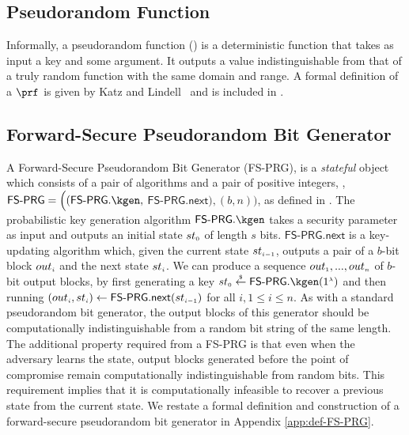  
 

\subsection{Pseudorandom Function}\label{subsec:PRF}

Informally, a pseudorandom function (\prf) is a deterministic function that takes as input a key and some argument. It outputs a value indistinguishable from that of a truly random function with the same domain and range.  A formal definition of a $\prf$ is given by Katz and Lindell~\cite{KatzLindell2014} and is included in .

\subsection{Forward-Secure Pseudorandom Bit Generator}

A Forward-Secure Pseudorandom Bit Generator (FS-PRG), is a \emph{stateful} object which consists of a pair of algorithms and a pair of positive integers, \ie, $\mathsf{FS\text{-}PRG} = \Big((\mathsf{FS\text{-}PRG}.\kgen, $ $ \mathsf{FS\text{-}PRG.next}),( b, n)\Big)$, as defined in \cite{BellareY03}.  The probabilistic key generation algorithm $\mathsf{FS\text{-}PRG}.\kgen$ takes a security parameter as input and outputs an initial state ${st}_{\scriptscriptstyle 0}$ of length $s$ bits. $\mathsf{FS\text{-}PRG.next}$ is a key-updating algorithm which, given the current state ${st}_{\scriptscriptstyle i-1}$, outputs a pair of a $b$-bit block ${out}_{\scriptscriptstyle i}$ and the next state ${st}_{\scriptscriptstyle i}$. We can produce a sequence  ${out}_{\scriptscriptstyle 1},..., {out}_{\scriptscriptstyle n}$  of  $b$-bit output blocks, by first generating a key  ${st}_{\sss 0}\stackrel{\sss \$}\leftarrow\mathsf{FS\text{-}PRG}.\kgen(1^{\sss \lambda})$ and then running $({out}_{\scriptscriptstyle i}, st_{\scriptscriptstyle i})\leftarrow  \mathsf{FS\text{-}PRG.next} (st_{\scriptscriptstyle i-1})$ for all $i, 1\leq i\leq n$. As with a standard pseudorandom bit generator, the output blocks of this generator should be computationally indistinguishable from a random bit
string of the same length. The additional property required from a
FS-PRG is that even when the
adversary learns the state, output blocks generated before the point of
compromise remain computationally indistinguishable from random bits.
This requirement implies that it is computationally infeasible to
recover a previous state from the current state. We restate a formal definition and construction of a forward-secure pseudorandom bit generator in Appendix \ref{app:def-FS-PRG}. 


